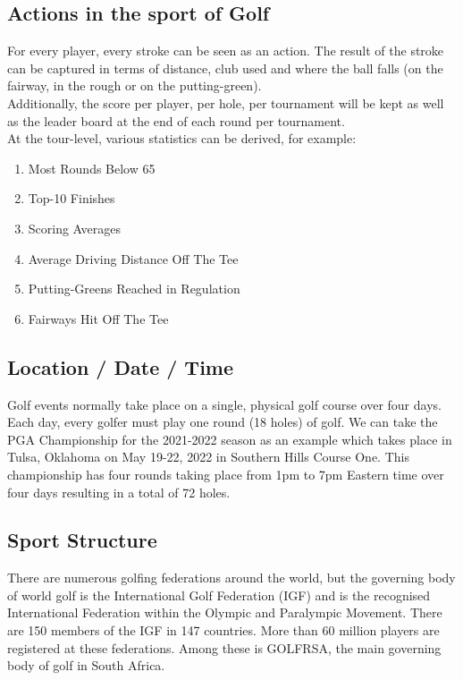 \documentclass[titlepage]{article}
\begin{document}
\subsection{Actions in the sport of Golf}

For every player, every stroke can be seen as an action. The result of the stroke can be captured in %
terms of distance, club used and where the ball falls (on the fairway, in the rough or on the putting-green). \\

\noindent
Additionally, the score per player, per hole, per tournament will be kept as well as the leader %
board at the end of each round per tournament. \\

\noindent
At the tour-level, various statistics can be derived, for example: 

\begin{enumerate}
  \item Most Rounds Below 65
  \item Top-10 Finishes
  \item Scoring Averages
  \item Average Driving Distance Off The Tee
  \item Putting-Greens Reached in Regulation
  \item Fairways Hit Off The Tee
\end{enumerate}

\subsection{Location / Date / Time}

Golf events normally take place on a single, physical golf course over four days. Each day, every golfer %
must play one round (18 holes) of golf. We can take the PGA Championship for the 2021-2022 season as an %
example which takes place in Tulsa, Oklahoma on May 19-22, 2022 in Southern Hills Course One. This %
championship has four rounds taking place from 1pm to 7pm Eastern time over four days resulting in a %
total of 72 holes.

\subsection{Sport Structure}

There are numerous golfing federations around the world, but the governing body of world golf is the %
International Golf Federation (IGF) and is the recognised International Federation within the Olympic %
and Paralympic Movement. There are 150 members of the IGF in 147 countries. More than 60 million %
players are registered at these federations. Among these is GOLFRSA, the main governing body of %
golf in South Africa.  \\
\end{document}
